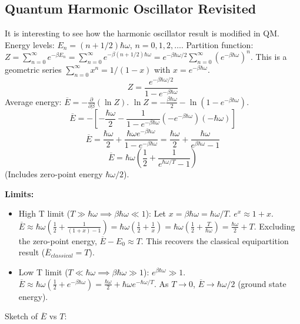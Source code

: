 \documentclass[11pt]{article}
\newcommand{\avg}[1]{\overline{#1}}
\newcommand{\pderiv}[2]{\frac{\partial #1}{\partial #2}}
\begin{document}
\subsection*{Quantum Harmonic Oscillator Revisited}

It is interesting to see how the harmonic oscillator result is modified in QM.
Energy levels: $E_n = (n+1/2)\hbar\omega$, $n=0, 1, 2, \dots$.
Partition function: $Z = \sum_{n=0}^\infty e^{-\beta E_n} = \sum_{n=0}^\infty e^{-\beta(n+1/2)\hbar\omega} = e^{-\beta\hbar\omega/2} \sum_{n=0}^\infty (e^{-\beta\hbar\omega})^n$.
This is a geometric series $\sum_{n=0}^\infty x^n = 1/(1-x)$ with $x=e^{-\beta\hbar\omega}$.
\[ Z = \frac{e^{-\beta\hbar\omega/2}}{1 - e^{-\beta\hbar\omega}} \]
Average energy: $\avg{E} = -\pderiv{}{\beta}(\ln Z)$.
$\ln Z = -\frac{\beta\hbar\omega}{2} - \ln(1 - e^{-\beta\hbar\omega})$.
\[ \avg{E} = - \left[ -\frac{\hbar\omega}{2} - \frac{1}{1 - e^{-\beta\hbar\omega}} (-e^{-\beta\hbar\omega}) (-\hbar\omega) \right] \]
\[ \avg{E} = \frac{\hbar\omega}{2} + \frac{\hbar\omega e^{-\beta\hbar\omega}}{1 - e^{-\beta\hbar\omega}} = \frac{\hbar\omega}{2} + \frac{\hbar\omega}{e^{\beta\hbar\omega} - 1} \]
\[ \avg{E} = \hbar\omega \left( \frac{1}{2} + \frac{1}{e^{\hbar\omega/T} - 1} \right) \]
(Includes zero-point energy $\hbar\omega/2$).

\textbf{Limits:}
\begin{itemize}
    \item High T limit ($T \gg \hbar\omega \implies \beta\hbar\omega \ll 1$): Let $x = \beta\hbar\omega = \hbar\omega/T$. $e^x \approx 1+x$.
    $\avg{E} \approx \hbar\omega (\frac{1}{2} + \frac{1}{(1+x)-1}) = \hbar\omega (\frac{1}{2} + \frac{1}{x}) = \hbar\omega (\frac{1}{2} + \frac{T}{\hbar\omega}) = \frac{\hbar\omega}{2} + T$.
    Excluding the zero-point energy, $\avg{E} - E_0 \approx T$. This recovers the classical equipartition result ($\avg{E}_{classical}=T$).
    \item Low T limit ($T \ll \hbar\omega \implies \beta\hbar\omega \gg 1$): $e^{\beta\hbar\omega} \gg 1$.
    $\avg{E} \approx \hbar\omega (\frac{1}{2} + e^{-\beta\hbar\omega}) = \frac{\hbar\omega}{2} + \hbar\omega e^{-\hbar\omega/T}$.
    As $T \to 0$, $\avg{E} \to \hbar\omega/2$ (ground state energy).
\end{itemize}

Sketch of $\avg{E}$ vs $T$:
\begin{center}
\end{center}
\end{document}

